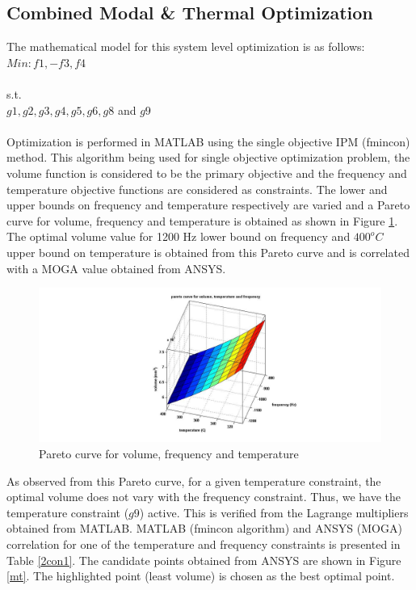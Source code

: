 \documentclass[12pt]{article}
\begin{document}
\subsection{Combined Modal \& Thermal Optimization}
The mathematical model for this system level optimization is as follows:\newline\newline
$Min: f1, -f3, f4$\\\\
s.t.\\  $g1, g2, g3, g4, g5, g6, g8$ and $g9$\\\\
Optimization is performed in MATLAB using the single objective IPM (fmincon) method. This algorithm being used for single objective optimization problem, the volume function is considered to be the primary objective and the frequency and temperature objective functions are considered as constraints. The lower and upper bounds on frequency and temperature respectively are varied and a Pareto curve for volume, frequency and temperature is obtained as shown in Figure \ref{pareto1}. The optimal volume value for 1200 Hz lower bound on frequency and $400^{o}C$ upper bound on temperature is obtained from this Pareto curve and is correlated with a MOGA value obtained from ANSYS.
\begin{figure}[H]
\begin{center}
\includegraphics[width=1.1\textwidth]{temp_freq_pareto.jpg}
\caption{Pareto curve for volume, frequency and temperature}
\label{pareto1}
\end{center}
\end{figure}
As observed from this Pareto curve, for a given temperature constraint, the optimal volume does not vary with the frequency constraint. Thus, we have the temperature constraint ($g9$) active. This is verified from the Lagrange multipliers obtained from MATLAB. MATLAB (fmincon algorithm) and ANSYS (MOGA) correlation for one of the temperature and frequency constraints is presented in Table \ref{2con1}. The candidate points obtained from ANSYS are shown in Figure \ref{mt}. The highlighted point (least volume) is chosen as the best optimal point.
\end{document}
